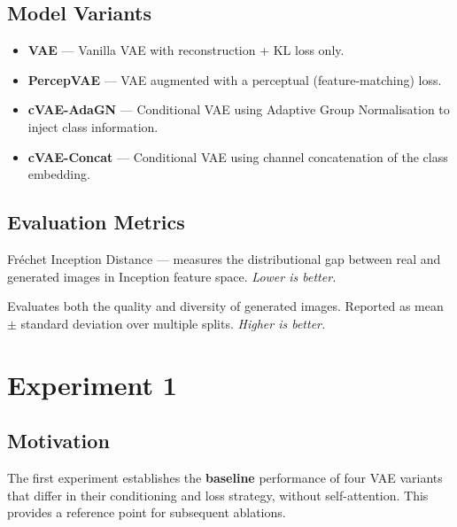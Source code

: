 \documentclass[12pt, a4paper]{article}
\begin{document}
\subsection{Model Variants}
\label{subsec:exp1-variants}

\begin{itemize}
	\item \textbf{VAE} — Vanilla VAE with reconstruction + KL loss only.
	\item \textbf{PercepVAE} — VAE augmented with a perceptual
	(feature-matching) loss.
	\item \textbf{cVAE-AdaGN} — Conditional VAE using Adaptive Group
	Normalisation to inject class information.
	\item \textbf{cVAE-Concat} — Conditional VAE using channel
	concatenation of the class embedding.
\end{itemize}

\subsection{Evaluation Metrics}
\label{subsec:metrics}

\begin{description}[leftmargin=2em]
    \item[\textbf{FID}] Fréchet Inception Distance — measures the
          distributional gap between real and generated images in
          Inception feature space. \emph{Lower is better.}

    \item[\textbf{IS (Inception Score)}] Evaluates both the quality and
          diversity of generated images. Reported as mean $\pm$ standard
          deviation over multiple splits. \emph{Higher is better.}
\end{description}

\section{Experiment 1}
\label{sec:exp1}

\subsection{Motivation}
\label{subsec:exp1-motivation}

The first experiment establishes the \textbf{baseline} performance of
four VAE variants that differ in their conditioning and loss strategy,
without self-attention. This provides a reference point for subsequent
ablations.
\end{document}
